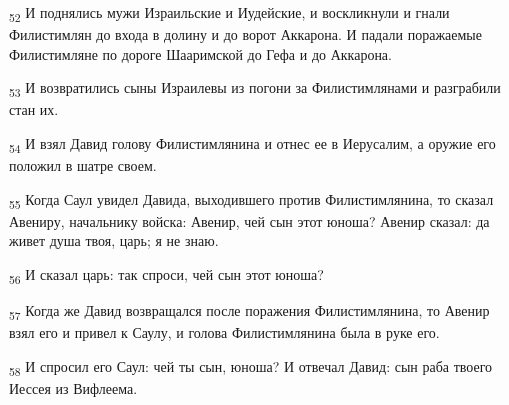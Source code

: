 \begin{tcolorbox}
\textsubscript{52} И поднялись мужи Израильские и Иудейские, и воскликнули и гнали Филистимлян до входа в долину и до ворот Аккарона. И падали поражаемые Филистимляне по дороге Шааримской до Гефа и до Аккарона.
\end{tcolorbox}
\begin{tcolorbox}
\textsubscript{53} И возвратились сыны Израилевы из погони за Филистимлянами и разграбили стан их.
\end{tcolorbox}
\begin{tcolorbox}
\textsubscript{54} И взял Давид голову Филистимлянина и отнес ее в Иерусалим, а оружие его положил в шатре своем.
\end{tcolorbox}
\begin{tcolorbox}
\textsubscript{55} Когда Саул увидел Давида, выходившего против Филистимлянина, то сказал Авениру, начальнику войска: Авенир, чей сын этот юноша? Авенир сказал: да живет душа твоя, царь; я не знаю.
\end{tcolorbox}
\begin{tcolorbox}
\textsubscript{56} И сказал царь: так спроси, чей сын этот юноша?
\end{tcolorbox}
\begin{tcolorbox}
\textsubscript{57} Когда же Давид возвращался после поражения Филистимлянина, то Авенир взял его и привел к Саулу, и голова Филистимлянина была в руке его.
\end{tcolorbox}
\begin{tcolorbox}
\textsubscript{58} И спросил его Саул: чей ты сын, юноша? И отвечал Давид: сын раба твоего Иессея из Вифлеема.
\end{tcolorbox}
